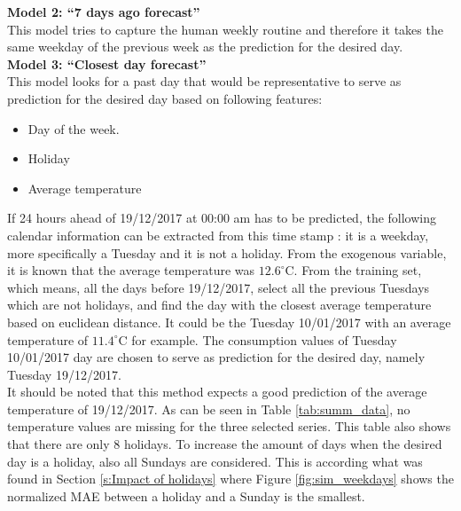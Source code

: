 \textbf{Model 2: ``7 days ago forecast''}\\
This model tries to capture the human weekly routine and therefore it takes the same weekday of the previous week as the prediction for the desired day.\\

\textbf{Model 3: ``Closest day forecast''}\\
This model looks for a past day that would be representative to serve as prediction for the desired day based on following features:

\begin{itemize}
	\item Day of the week.
	\item Holiday
	\item Average temperature
\end{itemize}

If 24 hours ahead of 19/12/2017 at 00:00 am has to be predicted, the following calendar information can be extracted from this time stamp : it is a weekday, more specifically a Tuesday and it is not a holiday. From the exogenous variable, it is known that the average temperature was $12.6^\circ$C. From the training set, which means, all the days before 19/12/2017, select all the previous Tuesdays which are not holidays, and find the day with the closest average temperature based on euclidean distance. It could be the Tuesday 10/01/2017 with an average temperature of $11.4^\circ$C for example. The consumption values of Tuesday 10/01/2017 day are chosen to serve as prediction for the desired day, namely Tuesday 19/12/2017.\\ 
It should be noted that this method expects a good prediction of the average temperature of 19/12/2017. As can be seen in Table \ref{tab:summ_data}, no temperature values are missing for the three selected series. This table also shows that there are only  $ 8 $ holidays. To increase the amount of days when the desired day is a holiday, also all Sundays are considered. This is according what was found in Section \ref{s:Impact of holidays} where Figure \ref{fig:sim_weekdays} shows the normalized MAE between a holiday and a Sunday is the smallest. \\

